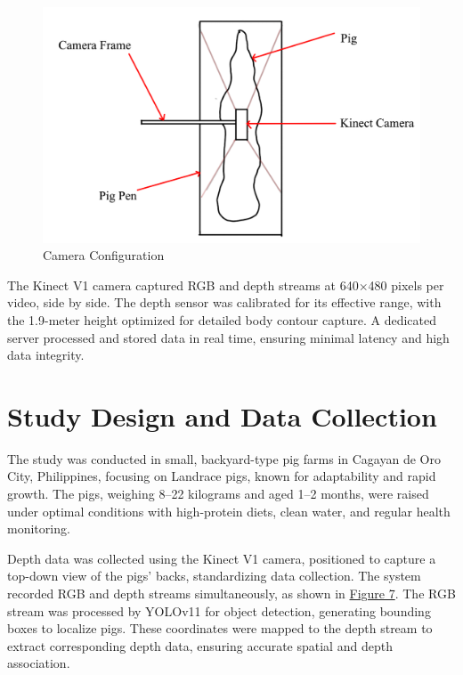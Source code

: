 {\begin{figure}[h]
	\centering
	\includegraphics[height=0.4\textheight]{figures/Camera Setup 2}
	\caption{Camera Configuration}
	\label{fig:Camera Configuration}
\end{figure}

The Kinect V1 camera captured RGB and depth streams at 640$\times$480 pixels per video, side by side. The depth sensor was calibrated for its effective range, with the 1.9-meter height optimized for detailed body contour capture. A dedicated server processed and stored data in real time, ensuring minimal latency and high data integrity.

\section{Study Design and Data Collection}

The study was conducted in small, backyard-type pig farms in Cagayan de Oro City, Philippines, focusing on Landrace pigs, known for adaptability and rapid growth. The pigs, weighing 8–22 kilograms and aged 1–2 months, were raised under optimal conditions with high-protein diets, clean water, and regular health monitoring.

Depth data was collected using the Kinect V1 camera, positioned to capture a top-down view of the pigs’ backs, standardizing data collection. The system recorded RGB and depth streams simultaneously, as shown in \hyperref[fig:raw output]{Figure 7}. The RGB stream was processed by YOLOv11 for object detection, generating bounding boxes to localize pigs. These coordinates were mapped to the depth stream to extract corresponding depth data, ensuring accurate spatial and depth association.

}
